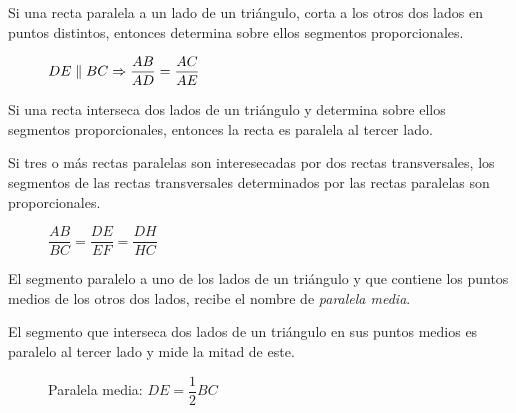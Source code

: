 
\begin{theorem}
    Si una recta paralela a un lado de un triángulo, corta a los otros dos lados en puntos distintos, entonces determina sobre ellos segmentos proporcionales.
    
    \begin{figure}[!h]
        \centering
        
        \caption{$DE \parallel BC \Rightarrow \dfrac{AB}{AD} = \dfrac{AC}{AE}$}
        \label{fig:theorem21}
    \end{figure}
\end{theorem}

\begin{theorem}
    Si una recta interseca dos lados de un triángulo y determina sobre ellos segmentos proporcionales, entonces la recta es paralela al tercer lado.    
\end{theorem}

\begin{theorem}
    Si tres o más rectas paralelas son interesecadas por dos rectas transversales, los segmentos de las rectas transversales determinados por las rectas paralelas son proporcionales.

    \begin{figure}[!h]
        \centering
        
        \caption{$\dfrac{AB}{BC} = \dfrac{DE}{EF} = \dfrac{DH}{HC}$}
        \label{fig:theorem22}
    \end{figure}    
\end{theorem}

\clearpage

\begin{definition}
    El segmento paralelo a uno de los lados de un triángulo y que contiene los puntos medios de los otros dos lados, recibe el nombre de \textit{paralela media}.
\end{definition}

\begin{theorem}
    El segmento que interseca dos lados de un triángulo en sus puntos medios es paralelo al tercer lado y mide la mitad de este.
\end{theorem}

\begin{figure}[!h]
    \centering
    
    \caption{Paralela media: $DE = \dfrac{1}{2}BC$}
    \label{fig:paralela-media}
\end{figure}    

